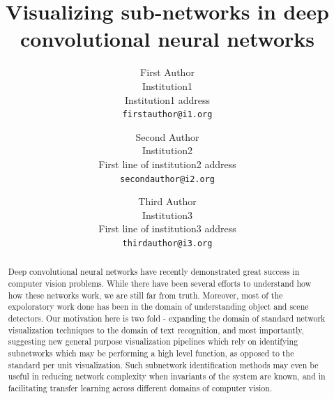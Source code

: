 \documentclass[10pt,twocolumn,letterpaper]{article}
\begin{document}
\title{Visualizing sub-networks in deep convolutional neural networks}

\author{First Author\\
Institution1\\
Institution1 address\\
{\tt\small firstauthor@i1.org}
\and
Second Author\\
Institution2\\
First line of institution2 address\\
{\tt\small secondauthor@i2.org}
\and
Third Author\\
Institution3\\
First line of institution3 address\\
{\tt\small thirdauthor@i3.org}
}

\maketitle

\begin{abstract}
   Deep convolutional neural networks have recently demonstrated great success in computer vision problems. While there have been several efforts to understand how how these networks work, we are still far from truth. Moreover, most of the expoloratory work done has been in the domain of understanding object and scene detectors. Our motivation here is two fold - expanding the domain of standard network visualization techniques to the domain of text recognition, and most importantly, suggesting new general purpose visualization pipelines which rely on identifying subnetworks which may be performing a high level function, as opposed to the standard per unit visualization. Such subnetwork identification methods may even be useful in reducing network complexity when invariants of the system are known, and in facilitating transfer learning across different domains of computer vision. 
\end{abstract}

\end{document}
